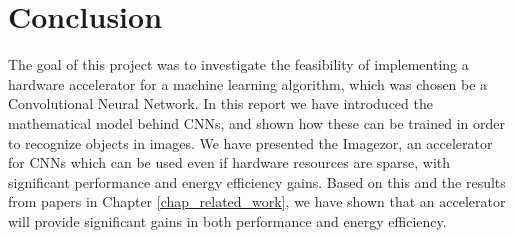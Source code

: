 \chapter{Conclusion}

The goal of this project was to investigate the feasibility of implementing a hardware accelerator for a machine learning algorithm, which was chosen be a Convolutional Neural Network. In this report we have introduced the mathematical model behind CNNs, and shown how these can be trained in order to recognize objects in images. We have presented the Imagezor, an accelerator for CNNs which can be used even if hardware resources are sparse, with significant performance and energy efficiency gains. Based on this and the results from papers in Chapter \ref{chap_related_work}, we have shown that an accelerator will provide significant gains in both performance and energy efficiency.  


